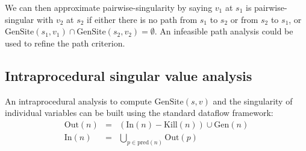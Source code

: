 \documentclass[11pt,notitlepage]{article}
\begin{document}
We can then approximate pairwise-singularity by saying $v_1$ at $s_1$
is pairwise-singular with $v_2$ at $s_2$ if either
there is no path from $s_1$ to $s_2$ or from $s_2$ to $s_1$, or
$\text{GenSite}(s_1,v_1) \cap \text{GenSite}(s_2,v_2) = \emptyset $.
An infeasible path analysis \cite{267921} could be used to refine
the path criterion.

\subsection{Intraprocedural singular value analysis}

An intraprocedural analysis to compute $\text{GenSite}(s, v)$ and the
singularity of individual variables can be built using the standard
dataflow framework:
\begin{eqnarray*}
\text{Out}(n)&=&\left(\text{In}(n)-\text{Kill}(n)\right)\cup\text{Gen}(n) \\
\text{In}(n)&=&\bigcup_{p\in\text{pred}(n)} \text{Out}(p)\\
\end{eqnarray*}
\end{document}
